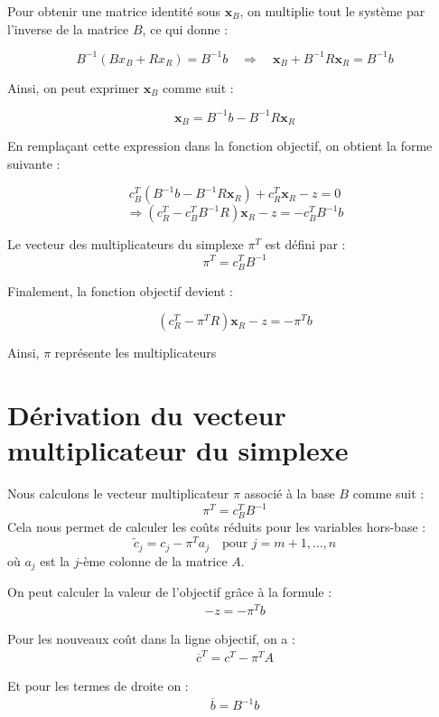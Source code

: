 \documentclass{report}
\begin{document}
\begin{multicols*}{2}
Pour obtenir une matrice identité sous \( \mathbf{x}_B \), on multiplie tout le système par l'inverse de la matrice \( B \), ce qui donne :

\[
B^{-1}(Bx_B + Rx_R) = B^{-1}b
\quad \Rightarrow \quad 
\mathbf{x}_B + B^{-1}R \mathbf{x}_R = B^{-1}b
\]

Ainsi, on peut exprimer \( \mathbf{x}_B \) comme suit :

\[
    \boxed{\mathbf{x}_B = B^{-1}b - B^{-1}R \mathbf{x}_R}
\]

En remplaçant cette expression dans la fonction objectif, on obtient la forme suivante :

\[
c_B^T \left(B^{-1}b - B^{-1}R \mathbf{x}_R\right) + c_R^T \mathbf{x}_R - z = 0
\]
\[
\Rightarrow \left(c_R^T - c_B^T B^{-1} R\right) \mathbf{x}_R - z = -c_B^T B^{-1} b
\]

Le vecteur des multiplicateurs du simplexe \( \pi^T \) est défini par :
\[
    \boxed{\pi^T = c_B^T B^{-1}}
\]

Finalement, la fonction objectif devient :

\[
    \boxed{\left(c_R^T - \pi^T R\right) \mathbf{x}_R - z = -\pi^T b}
\]

Ainsi, \( \pi \) représente les multiplicateurs

\section{Dérivation du vecteur multiplicateur du simplexe}

Nous calculons le vecteur multiplicateur \( \pi \) associé à la base \( B \) comme suit :
\[
\pi^T = c_B^T B^{-1}
\]
Cela nous permet de calculer les coûts réduits pour les variables hors-base :
\[
    \boxed{\tilde{c}_j = c_j - \pi^T a_j \quad \text{pour } j = m+1, \dots, n}
\]
où \( a_j \) est la \( j \)-ème colonne de la matrice \( A \).

On peut calculer la valeur de l'objectif grâce à la formule :
\begin{align*}
    \boxed{- z = -\pi^Tb}
\end{align*}

Pour les nouveaux coût dans la ligne objectif, on a :
\begin{align*}
    \overline{c}^T = c^T -\pi^TA
\end{align*}

Et pour les termes de droite on :
\begin{align*}
    \boxed{\overline{b} = B^{-1}b}
\end{align*}


\end{multicols*}
\end{document}
